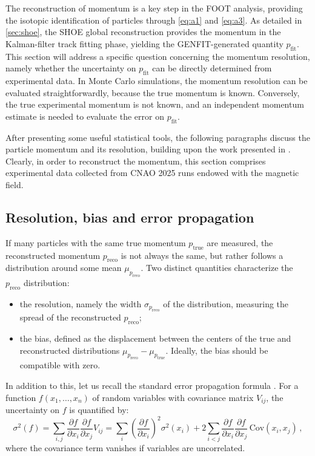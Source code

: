 The reconstruction of momentum is a key step in the FOOT analysis, providing the isotopic identification of particles through \autoref{eq:a1} and \autoref{eq:a3}. As detailed in \autoref{sec:shoe}, the SHOE global reconstruction provides the momentum in the Kalman-filter track fitting phase, yielding the GENFIT-generated quantity $p_{\text{fit}}$. This section will address a specific question concerning the momentum resolution, namely whether the uncertainty on $p_{\text{fit}}$ can be directly determined from experimental data. In Monte Carlo simulations, the momentum resolution can be evaluated straightforwardly, because the true momentum is known. Conversely, the true experimental momentum is not known, and an independent momentum estimate is needed to evaluate the error on $p_{\text{fit}}$.

After presenting some useful statistical tools, the following paragraphs discuss the particle momentum and its resolution, building upon the work presented in \cite{UbaldiPhysicsMeeting26}. Clearly, in order to reconstruct the momentum, this section comprises experimental data collected from CNAO 2025 runs endowed with the magnetic field.
\subsection{Resolution, bias and error propagation}\label{ssec:resolution_bias_error_propagation}
If many particles with the same true momentum $p_\text{true}$ are measured, the reconstructed momentum $p_\text{reco}$ is not always the same, but rather follows a distribution around some mean $\mu_{p_\text{reco}}$. Two distinct quantities characterize the $p_\text{reco}$ distribution:
\begin{itemize}
	\item the resolution, namely the width $\sigma_{p_\text{reco}}$ of the distribution, measuring the spread of the reconstructed $p_\text{reco}$;
	\item the bias, defined as the displacement between the centers of the true and reconstructed distributions $\mu_{p_\text{reco}}-\mu_{p_\text{true}}$. Ideally, the bias should be compatible with zero.
\end{itemize}
In addition to this, let us recall the standard error propagation formula \cite{10.1093/oso/9780198501565.002.0001}. For a function $f(x_1,\dots,x_n)$ of random variables with covariance matrix $V_{ij}$, the uncertainty on $f$ is quantified by:
\begin{equation}
	\sigma^2(f)=\sum_{i,j}\frac{\partial f}{\partial x_i}\frac{\partial f}{\partial x_j}V_{ij}
	=\sum_i\left(\frac{\partial f}{\partial x_i}\right)^2\sigma^2(x_i)+2\sum_{i<j}\frac{\partial f}{\partial x_i}\frac{\partial f}{\partial x_j}\,\mathrm{Cov}(x_i,x_j)\,,
	\label{eq:error_propagation}
\end{equation}
where the covariance term vanishes if variables are uncorrelated.

